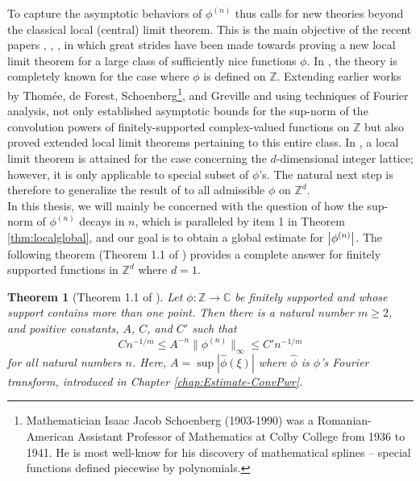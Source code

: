\documentclass[11pt, letter]{book}
\newtheorem{theorem}{Theorem}[section]
\begin{document}
\noindent  To capture the asymptotic behaviors of $\phi^{(n)}$ thus calls for new theories beyond the classical local (central) limit theorem. This is the main objective of the recent papers \cite{randles_convolution_2015}, \cite{randles_convolution_2017}, \cite{diaconis_convolution_2014}, in which great strides have been made towards proving a new local limit theorem for a large class of sufficiently nice functions $\phi$. In \cite{randles_convolution_2015}, the theory is completely known for the case where $\phi$ is defined on $\mathbb{Z}$. Extending earlier works by Thom\'{e}e, de Forest, Schoenberg\footnote{Mathematician Isaac Jacob Schoenberg (1903-1990) was a Romanian-American Assistant Professor of Mathematics at Colby College from 1936 to 1941. He is most well-know for his discovery of mathematical splines --  special functions defined piecewise by polynomials.}, and Greville and using techniques of Fourier analysis, \cite{randles_convolution_2015} not only established asymptotic bounds for the sup-norm of the convolution powers of finitely-supported complex-valued functions on $\mathbb{Z}$ but also proved extended local limit theorems pertaining to this entire class. In \cite{randles_convolution_2017}, a local limit theorem is attained for the case concerning the $d$-dimensional integer lattice; however, it is only applicable to special subset of $\phi$'s. The natural next step is therefore to generalize the result of \cite{randles_convolution_2017} to all admissible $\phi$ on $\mathbb{Z}^d$.\\



\noindent In this thesis, we will mainly be concerned with the question of how the sup-norm of $\phi^{(n)}$ decays in $n$, which is paralleled by item 1 in Theorem \ref{thm:localglobal}, and our goal is to obtain a global estimate for $\abs{\phi^{(n)}}$. The following theorem (Theorem 1.1 of \cite{randles_convolution_2015}) provides a complete answer for finitely supported functions in $\mathbb{Z}^d$ where $d=1$. 


\begin{framed}
\begin{theorem}[Theorem 1.1 of \cite{randles_convolution_2015}]
Let $\phi : \mathbb{Z} \to \mathbb{C}$ be finitely supported and whose support contains more than one point. Then there is a natural number $m \geq 2$, and positive constants, $A$, $C$, and $C'$ such that 
\begin{equation*}
    Cn^{-1/m} \leq A^{-n}\| \phi^{(n)} \|_\infty \leq C' n^{-1/m}
\end{equation*}
for all natural numbers $n$. Here, $A=\sup|\widehat{\phi}(\xi)|$ where $\widehat{\phi}$ is $\phi$'s Fourier transform, introduced in Chapter \ref{chap:Estimate-ConvPwr}.
\end{theorem}
\end{framed}
\end{document}
